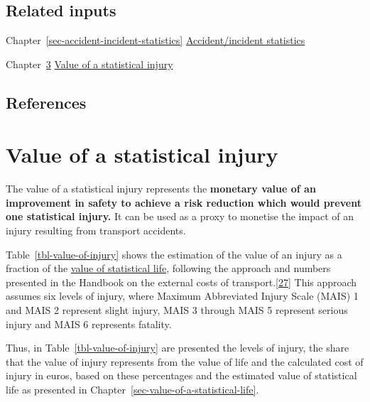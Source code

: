 \documentclass[
  11pt,
  a4paper,
]{book}
\begin{document}
\hypertarget{related-inputs-27}{%
\section{Related inputs}\label{related-inputs-27}}

Chapter~\ref{sec-accident-incident-statistics}
\protect\hyperlink{sec-accident-incident-statistics}{Accident/incident
statistics}

Chapter~\ref{sec-value-of-statistical-injury}
\protect\hyperlink{sec-value-of-statistical-injury}{Value of a
statistical injury}

\hypertarget{references-38}{%
\section{References}\label{references-38}}

\hypertarget{sec-value-of-statistical-injury}{%
\chapter{Value of a statistical
injury}\label{sec-value-of-statistical-injury}}

The value of a statistical injury represents the \textbf{monetary value
of an improvement in safety to achieve a risk reduction which would
prevent one statistical injury.} It can be used as a proxy to monetise
the impact of an injury resulting from transport accidents.

Table~\ref{tbl-value-of-injury} shows the estimation of the value of an
injury as a fraction of the
\protect\hyperlink{sec-value-of-a-statistical-life}{value of statistical
life}, following the approach and numbers presented in the Handbook on
the external costs of
transport.\protect\hyperlink{ref-ecdgmove2019}{{[}27{]}} This approach
assumes six levels of injury, where Maximum Abbreviated Injury Scale
(MAIS) 1 and MAIS 2 represent slight injury, MAIS 3 through MAIS 5
represent serious injury and MAIS 6 represents fatality.

Thus, in Table~\ref{tbl-value-of-injury} are presented the levels of
injury, the share that the value of injury represents from the value of
life and the calculated cost of injury in euros, based on these
percentages and the estimated value of statistical life as presented in
Chapter~\ref{sec-value-of-a-statistical-life}.
\end{document}
